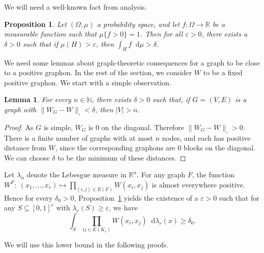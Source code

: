 \documentclass[10pt]{article}
\theoremstyle{plain}
\newtheorem{lem}[thm]{Lemma}
\newtheorem{prop}[thm]{Proposition}
\theoremstyle{definition}
\newcommand{\R}{\mathbb{R}}
\newcommand*\diff{\mathop{}\!\mathrm{d}}
\newcommand{\bbR}{\mathbb{R}}
\newcommand{\bbN}{\mathbb{N}}
\begin{document}
We will need a well-known fact from analysis.

\begin{prop}\label{PROP:INT_OF_POS_FUNC}
    Let $(\Omega,\mu)$ a probability space, and let $f\colon \Omega\to \R$ be a measurable function such that $\mu\{f>0\}=1$. Then for all $\varepsilon>0$, there exists a $\delta>0$ such that if $\mu(H)>\varepsilon$, then $\int_Hf\diff\mu>\delta$.
\end{prop}

We need some lemmas about graph-theoretic consequences for a graph to be close to a positive graphon. In the rest of the section, we consider $W$ to be a fixed positive graphon. We start with a simple observation.

\begin{lem}\label{LEM:GRAPH-BIG}
For every $n\in\bbN$, there exists $\delta>0$ such that, if $G=(V,E)$ is a graph with $\|W_G-W\|_\square<\delta$, then $|V|> n$.
\end{lem}
\begin{proof}
    As $G$ is simple, $W_G$ is $0$ on the diagonal. Therefore $\|W_G-W\|_{\square}>0$.
    There is a finite number of graphs with at most $n$ nodes, and each has  positive distance from $W$, since the corresponding graphons are 0 blocks on the diagonal. We can choose $\delta$ to be the minimum of these distances. 
\end{proof}

Let $\lambda_n$ denote the Lebesgue measure in $\bbR^n$. For any graph $F$, the function $W^F\colon~ (x_1,\dots,x_r)\mapsto \prod_{(i,j)\in E(F)} W(x_i,x_j)$ is almost everywhere positive. Hence for every $\delta_0>0$, Proposition~\ref{PROP:INT_OF_POS_FUNC} yields the existence of a $\varepsilon>0$ such that for any $S\subseteq[0,1]^r$ with $\lambda_r(S)\ge \varepsilon$, we have 
    \begin{equation}
    \int_{S}\prod_{ij\in E(K_r)}W(x_i,x_j)\diff \lambda_r(x)\ge \delta_0. \label{eq:d0}
    \end{equation}
    
We will use this lower bound in the following proofs.
\end{document}
